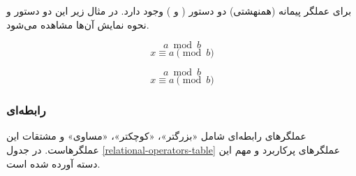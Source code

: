 \begin{note}
برای عملگر پیمانه (همنهشتی) دو دستور
( و ) وجود دارد.
در مثال زیر این دو دستور و نحوه نمایش آن‌ها مشاهده می‌شود.
\end{note}
\begin{latex}
\[
 a \bmod b
\]
\[
x \equiv a \pmod b
\]
\end{latex}
\[
 a \bmod b
\]
\[
x \equiv a \pmod b
\]

\subsubsection{رابطه‌ای}
عملگرهای رابطه‌ای شامل «بزرگتر»، «کوچکتر»، «مساوی» و مشتقات این عملگرهاست. در
جدول \ref{relational-operators-table} عملگرهای پرکاربرد و مهم این دسته آورده شده است.

